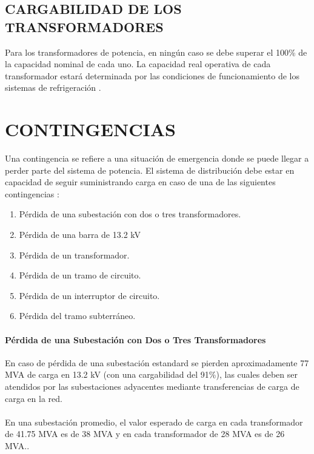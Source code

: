 \documentclass[a5paper]{book}%
\begin{document}
\section{CARGABILIDAD DE LOS TRANSFORMADORES}

Para los transformadores de potencia, en ningún caso se debe superar el 100\% de la capacidad nominal de cada uno. La capacidad real operativa de cada transformador estará determinada por las condiciones
de funcionamiento de los sistemas de refrigeración \cite{MANOPEMCALI}.

\chapter{CONTINGENCIAS}

Una contingencia se refiere a una situación de emergencia donde se puede llegar a perder parte del sistema de potencia. El sistema de distribución debe estar en capacidad de seguir suministrando carga en caso de una de las siguientes contingencias \cite{EMCALI2007}:

\begin{enumerate}
	\item Pérdida de una subestación con dos o tres transformadores.
	\item Pérdida de una barra de 13.2 kV
	\item Pérdida de un transformador.
	\item Pérdida de un tramo de circuito.
	\item Pérdida de un interruptor de circuito.
	\item Pérdida del tramo subterráneo.
\end{enumerate}

\subsubsection{Pérdida de una Subestación con Dos o Tres Transformadores}

En caso de pérdida de una subestación estandard se pierden
aproximadamente 77 MVA de carga en 13.2 kV (con una cargabilidad del 91\%), las cuales deben ser atendidos por las subestaciones adyacentes mediante transferencias de carga  de carga en la red.\\\\
 En una subestación promedio, el valor esperado de carga en cada transformador de 41.75 MVA es de 38 MVA y en cada transformador de 28 MVA es de 26 MVA.\cite{EMCALI2007}.\\\\
\end{document}
